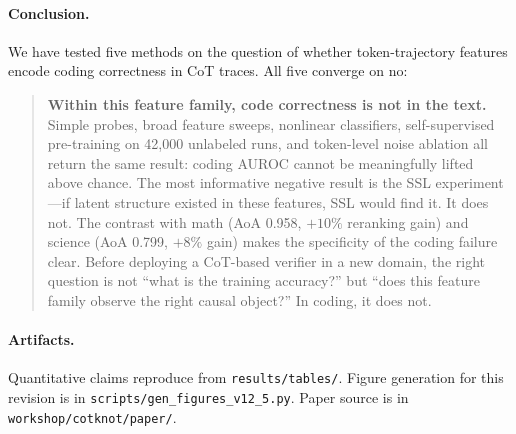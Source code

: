 \documentclass{article}
\begin{document}
\paragraph{Conclusion.} We have tested five methods on the question of whether token-trajectory features encode coding correctness in CoT traces. All five converge on no:

\begin{quote}
\textbf{Within this feature family, code correctness is not in the text.}
Simple probes, broad feature sweeps, nonlinear classifiers, self-supervised pre-training on 42,000 unlabeled runs, and token-level noise ablation all return the same result: coding AUROC cannot be meaningfully lifted above chance. The most informative negative result is the SSL experiment---if latent structure existed in these features, SSL would find it. It does not.
The contrast with math (AoA 0.958, $+10\%$ reranking gain) and science (AoA 0.799, $+8\%$ gain) makes the specificity of the coding failure clear. Before deploying a CoT-based verifier in a new domain, the right question is not ``what is the training accuracy?'' but ``does this feature family observe the right causal object?'' In coding, it does not.
\end{quote}

\paragraph{Artifacts.} Quantitative claims reproduce from \texttt{results/tables/}. Figure generation for this revision is in \texttt{scripts/gen\_figures\_v12\_5.py}. Paper source is in \texttt{workshop/cotknot/paper/}.
\end{document}
